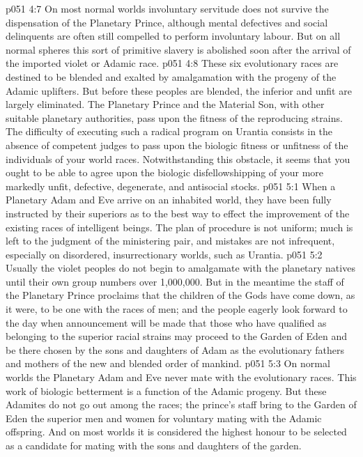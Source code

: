 \vs p051 4:7 On most normal worlds involuntary servitude does not survive the dispensation of the Planetary Prince, although mental defectives and social delinquents are often still compelled to perform involuntary labour. But on all normal spheres this sort of primitive slavery is abolished soon after the arrival of the imported violet or Adamic race.
\vs p051 4:8 These six evolutionary races are destined to be blended and exalted by amalgamation with the progeny of the Adamic uplifters. But before these peoples are blended, the inferior and unfit are largely eliminated. The Planetary Prince and the Material Son, with other suitable planetary authorities, pass upon the fitness of the reproducing strains. The difficulty of executing such a radical program on Urantia consists in the absence of competent judges to pass upon the biologic fitness or unfitness of the individuals of your world races. Notwithstanding this obstacle, it seems that you ought to be able to agree upon the biologic disfellowshipping of your more markedly unfit, defective, degenerate, and antisocial stocks.
\vs p051 5:1 When a Planetary Adam and Eve arrive on an inhabited world, they have been fully instructed by their superiors as to the best way to effect the improvement of the existing races of intelligent beings. The plan of procedure is not uniform; much is left to the judgment of the ministering pair, and mistakes are not infrequent, especially on disordered, insurrectionary worlds, such as Urantia.
\vs p051 5:2 Usually the violet peoples do not begin to amalgamate with the planetary natives until their own group numbers over 1,000,000. But in the meantime the staff of the Planetary Prince proclaims that the children of the Gods have come down, as it were, to be one with the races of men; and the people eagerly look forward to the day when announcement will be made that those who have qualified as belonging to the superior racial strains may proceed to the Garden of Eden and be there chosen by the sons and daughters of Adam as the evolutionary fathers and mothers of the new and blended order of mankind.
\vs p051 5:3 On normal worlds the Planetary Adam and Eve never mate with the evolutionary races. This work of biologic betterment is a function of the Adamic progeny. But these Adamites do not go out among the races; the prince’s staff bring to the Garden of Eden the superior men and women for voluntary mating with the Adamic offspring. And on most worlds it is considered the highest honour to be selected as a candidate for mating with the sons and daughters of the garden.
